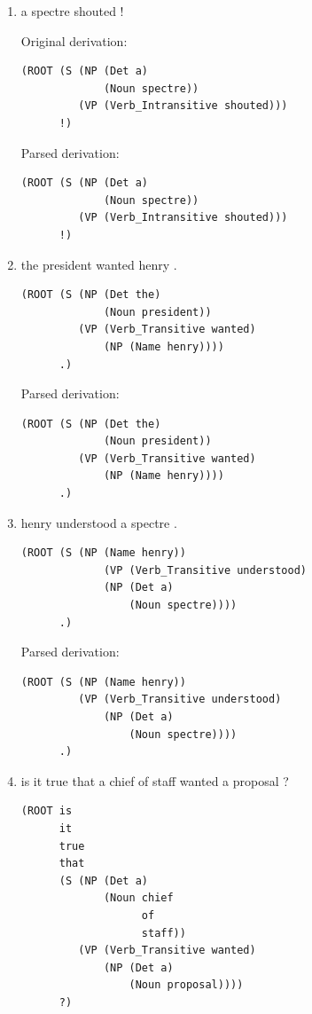 \documentclass[11pt]{article}
\begin{document}
\begin{enumerate}[label=(\arabic*)]
      \item a spectre shouted !

            Original derivation:
            \begin{verbatim}
(ROOT (S (NP (Det a)
             (Noun spectre))
         (VP (Verb_Intransitive shouted)))
      !)
      \end{verbatim}

            Parsed derivation:
            \begin{verbatim}
(ROOT (S (NP (Det a)
             (Noun spectre))
         (VP (Verb_Intransitive shouted)))
      !)
      \end{verbatim}
      \item the president wanted henry .

            \begin{verbatim}
(ROOT (S (NP (Det the)
             (Noun president))
         (VP (Verb_Transitive wanted)
             (NP (Name henry))))
      .)
      \end{verbatim}

            Parsed derivation:
            \begin{verbatim}
(ROOT (S (NP (Det the)
             (Noun president))
         (VP (Verb_Transitive wanted)
             (NP (Name henry))))
      .)
      \end{verbatim}
      \item henry understood a spectre .

            \begin{verbatim}
(ROOT (S (NP (Name henry))
             (VP (Verb_Transitive understood)
             (NP (Det a)
                 (Noun spectre))))
      .)
      \end{verbatim}

            Parsed derivation:
            \begin{verbatim}
(ROOT (S (NP (Name henry))
         (VP (Verb_Transitive understood)
             (NP (Det a)
                 (Noun spectre))))
      .)
      \end{verbatim}
      \item is it true that a chief of staff wanted a proposal ?

            \begin{verbatim}
(ROOT is
      it
      true
      that
      (S (NP (Det a)
             (Noun chief
                   of
                   staff))
         (VP (Verb_Transitive wanted)
             (NP (Det a)
                 (Noun proposal))))
      ?)
      \end{verbatim}


\end{enumerate}
\end{document}
